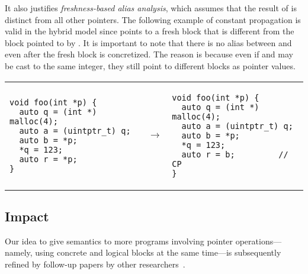 It also justifies %
\textit{freshness-based alias analysis}, which assumes that the result of
 is distinct from all other pointers.  The 
following example of constant propagation is valid in the
hybrid model since  points to a fresh block that
is different from the block pointed to by .
It is important to note that there is no alias
between  and  even after
the fresh block is concretized. The reason is because
even if  and  may be cast to the same integer,
they still point to different blocks as pointer values.
\begin{center}
\begin{tabular}{@{}l@{}l@{~~}l}
\small
\begin{minipage}{0.45\textwidth}
\begin{verbatim}
void foo(int *p) {
  auto q = (int *) malloc(4);
  auto a = (uintptr_t) q;
  auto b = *p;
  *q = 123;
  auto r = *p;
}
\end{verbatim}
\end{minipage}
&
$~\rightarrow$
&
\small
\begin{minipage}{0.45\textwidth}
\begin{verbatim}
void foo(int *p) {
  auto q = (int *) malloc(4);
  auto a = (uintptr_t) q;
  auto b = *p;
  *q = 123;
  auto r = b;         // CP
}
\end{verbatim}
\end{minipage}
\end{tabular}
\end{center}




\subsection{Impact}


Our idea to give semantics to more programs involving pointer operations---namely, using concrete
and logical blocks at the same time---is subsequently refined by follow-up papers by other
researchers~\cite{intptrcast-oopsla,intptrcast-popl}.

